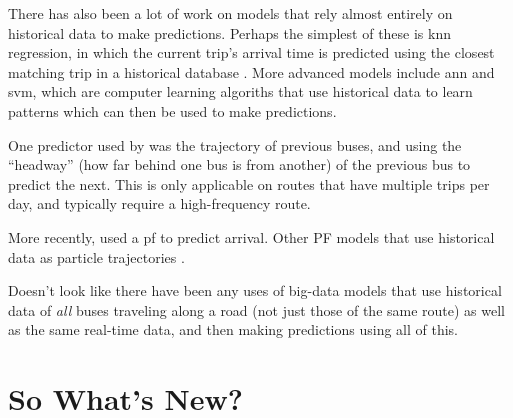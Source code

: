 \documentclass[12pt,a4paper]{article}
\begin{document}
There has also been a lot of work on models that rely almost entirely on historical 
data to make predictions.
Perhaps the simplest of these is \gls{knn} regression,
in which the current trip's arrival time is predicted using the closest
matching trip in a historical database \citep{cn}.
More advanced models include \gls{ann} and \gls{svm},
which are computer learning algoriths that use historical data to
learn patterns which can then be used to make predictions.

One predictor used by \cite{cn} was the trajectory of previous buses,
and using the ``headway'' (how far behind one bus is from another)
of the previous bus to predict the next.
This is only applicable on routes that have multiple trips per day,
and typically require a high-frequency route.


More recently, \cite{hans-etal:2015} used a \gls{pf} to predict arrival.
Other PF models that use historical data as particle trajectories
\citep{chen-rakha:2014}.


Doesn't look like there have been any uses of big-data models that use
historical data of \emph{all} buses traveling along a road
(not just those of the same route) as well as the same real-time data,
and then making predictions using all of this.












\section{So What's New?}
\label{sec:whatsnew}






\end{document}

